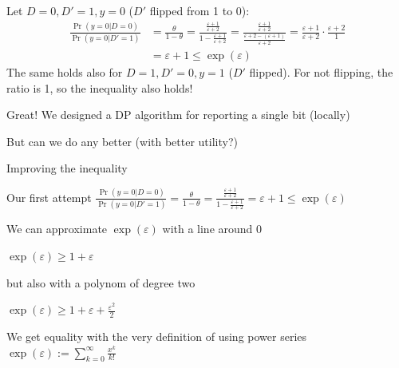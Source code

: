 \documentclass[12pt,aspectratio=169,handout]{beamer}
\begin{document}
\begin{frame}

Let $D = 0, D' = 1, y = 0$ ($D'$ flipped from 1 to 0):
$$
\begin{aligned}
\frac{\Pr(y = 0 | D = 0)}{\Pr(y = 0 | D' = 1)} &=
\frac{\theta}{1 - \theta}
=
\frac{
\frac{\varepsilon + 1}{\varepsilon + 2}
}{
	1 - \frac{\varepsilon + 1}{\varepsilon + 2}
}
=
\frac{
\frac{\varepsilon + 1}{\varepsilon + 2}
}{
\frac{\varepsilon + 2 - (\varepsilon + 1)}{\varepsilon + 2}
}
=
\frac{\varepsilon + 1}{\varepsilon + 2}
\cdot
\frac{\varepsilon + 2}{1}
\\
&=
\varepsilon + 1
\leq \exp(\varepsilon)
\end{aligned}
$$
The same holds also for $D = 1, D' = 0, y = 1$ ($D'$ flipped). For not flipping, the ratio is 1, so the inequality also holds!

Great! We designed a DP algorithm for reporting a single bit (locally)

But can we do any better (with better utility?)

\end{frame}





\begin{frame}{Improving the inequality}

\begin{block}{Our first attempt}
$\frac{\Pr(y = 0 | D = 0)}{\Pr(y = 0 | D' = 1)} =
\frac{\theta}{1 - \theta} =
\frac{
\frac{\varepsilon + 1}{\varepsilon + 2}
}{
	1 - \frac{\varepsilon + 1}{\varepsilon + 2}
}
=
\varepsilon + 1
\leq \exp(\varepsilon)$
\end{block}

We can approximate $\exp(\varepsilon)$ with a line around 0

$\exp(\varepsilon) \geq 1 + \varepsilon$

but also with a polynom of degree two

$\exp(\varepsilon) \geq 1 + \varepsilon + \frac{\varepsilon^2}{2}$

We get equality with the very definition of using power series
$\exp(\varepsilon) := \sum_{k = 0}^{\infty} \frac{x^k}{k!}$
\end{frame}
\end{document}
